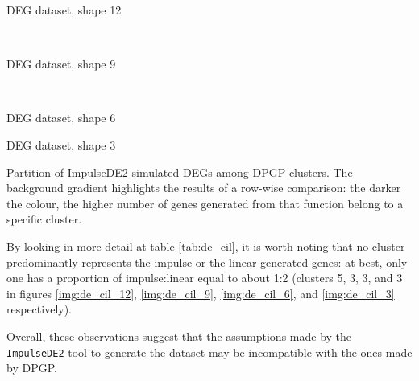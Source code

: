 \begin{table}[!ht]
    \centering\footnotesize
    \settowidth{\mytablewidth}{}
    \parbox{\mytablewidth}{
        {\normalsize DEG dataset, shape 12}\smallskip
        
        
    }\\\bigskip

    \settowidth{\mytablewidth}{}
    \parbox{\mytablewidth}{
        {\normalsize DEG dataset, shape 9}\smallskip
        
        
    }\\\bigskip

    \settowidth{\mytablewidth}{}
    \parbox{\mytablewidth}{
        {\normalsize DEG dataset, shape 6}\smallskip

        
    }
    \settowidth{\mytablewidth}{}
    \parbox{\mytablewidth}{
        {\normalsize DEG dataset, shape 3}\smallskip
        
        
    }
    \caption[Partition of ImpulseDE2-simulated DEGs among clusters]{Partition of ImpulseDE2-simulated DEGs among DPGP clusters. The background gradient highlights the results of a row-wise comparison: the darker the colour, the higher number of genes generated from that function belong to a specific cluster.}\label{tab:de_cil}
\end{table}

By looking in more detail at table \ref{tab:de_cil}, it is worth noting that no cluster predominantly represents the impulse or the linear generated genes: at best, only one has a proportion of impulse:linear equal to about 1:2 (clusters 5, 3, 3, and 3 in figures \ref{img:de_cil_12}, \ref{img:de_cil_9}, \ref{img:de_cil_6}, and \ref{img:de_cil_3} respectively).

Overall, these observations suggest that the assumptions made by the \texttt{ImpulseDE2} tool to generate the dataset may be incompatible with the ones made by DPGP.

